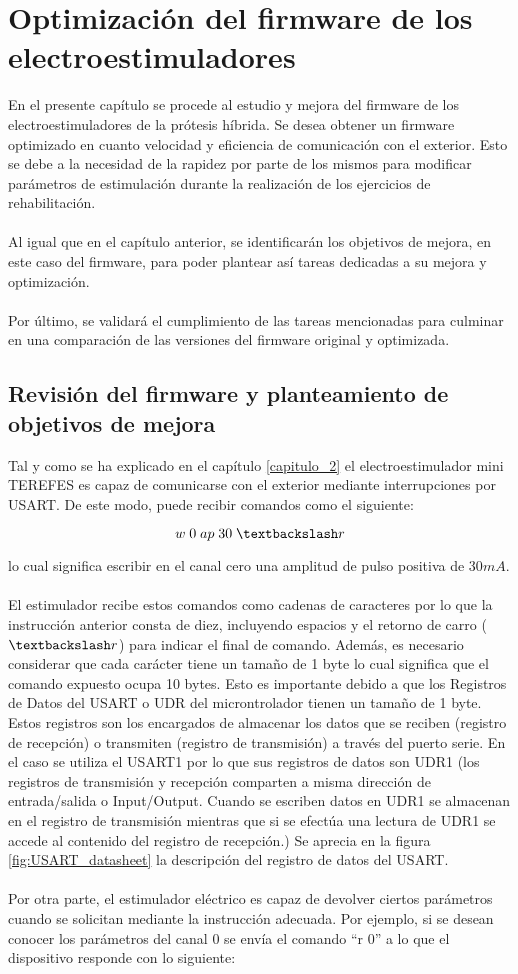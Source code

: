 \chapter{Optimización del firmware de los electroestimuladores}
En el presente capítulo se procede al estudio y mejora del firmware de los electroestimuladores de la prótesis híbrida. Se desea obtener un firmware optimizado en cuanto velocidad y eficiencia de comunicación con el exterior. Esto se debe a la necesidad de la rapidez por parte de los mismos para modificar parámetros de estimulación durante la realización de los ejercicios de rehabilitación.
\\
\\
Al igual que en el capítulo anterior, se identificarán los objetivos de mejora, en este caso del firmware, para poder plantear así tareas dedicadas a su mejora y optimización.
\\
\\
Por último, se validará el cumplimiento de las tareas mencionadas para culminar en una comparación de las versiones del firmware original y optimizada.

\section{Revisión del firmware y planteamiento de objetivos de mejora}
Tal y como se ha explicado en el capítulo \ref{capitulo_2} el electroestimulador mini TEREFES es capaz de comunicarse con el exterior mediante interrupciones por USART. De este modo, puede recibir comandos como el siguiente:

$$w\;0\;ap\;30\;\textbackslash r$$

lo cual significa escribir en el canal cero una amplitud de pulso positiva de 30$mA$.
\\
\\
El estimulador recibe estos comandos como cadenas de caracteres por lo que la instrucción anterior consta de diez, incluyendo espacios y el retorno de carro ($\textbackslash r$) para indicar el final de comando. Además, es necesario considerar que cada carácter tiene un tamaño de 1 byte lo cual significa que el comando expuesto ocupa 10 bytes. Esto es importante debido a que los Registros de Datos del USART o UDR del microntrolador tienen un tamaño de 1 byte. Estos registros son los encargados de almacenar los datos que se reciben (registro de recepción) o transmiten (registro de transmisión) a través del puerto serie. En el caso se utiliza el USART1 por lo que sus registros de datos son UDR1 (los registros de transmisión y recepción comparten a misma dirección de entrada/salida o Input/Output. Cuando se escriben datos en UDR1 se almacenan en el registro de transmisión mientras que si se efectúa una lectura de UDR1 se accede al contenido del registro de recepción.) Se aprecia en la figura \ref{fig:USART_datasheet} la descripción del registro de datos del USART.
\\
\\
Por otra parte, el estimulador eléctrico es capaz de devolver ciertos parámetros cuando se solicitan mediante la instrucción adecuada. Por ejemplo, si se desean conocer los parámetros del canal 0 se envía el comando ``r 0'' a lo que el dispositivo responde con lo siguiente:

